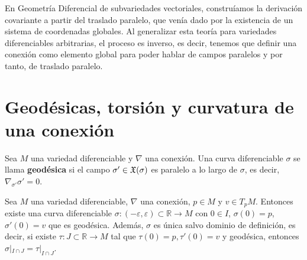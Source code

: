 \begin{obs}
    En Geometría Diferencial de subvariedades vectoriales, construíamos la derivación covariante a partir del traslado paralelo, que venía dado por la existencia de un sistema de coordenadas globales. Al generalizar esta teoría para variedades diferenciables arbitrarias, el proceso es inverso, es decir, tenemos que definir una conexión como elemento global para poder hablar de campos paralelos y por tanto, de traslado paralelo.
\end{obs}

\section{Geodésicas, torsión y curvatura de una conexión}

\begin{defi}
    Sea $M$ una variedad diferenciable y $\nabla$ una conexión. Una curva diferenciable $\sigma$ se llama \textbf{geodésica} si el campo $\sigma' \in \mathfrak{X}(\sigma)$ es paralelo a lo largo de $\sigma$, es decir, $\nabla_{\sigma'}\sigma' = 0$.
\end{defi}
\begin{teo}
    Sea $M$ una variedad diferenciable, $\nabla$ una conexión, $p \in M$ y $v \in T_pM$. Entonces existe una curva diferenciable $\sigma: (-\varepsilon, \varepsilon) \subset \mathbb R \to M$ con $0 \in I$, $\sigma(0) = p$, $\sigma'(0) = v$ que es geodésica. Además, $\sigma$ es única salvo dominio de definición, es decir, si existe $\tau: J \subset \mathbb R \to M$ tal que $\tau(0) = p, \tau'(0) = v$ y geodésica, entonces $\sigma|_{I \cap J} = \tau|_{I \cap J}$.
\end{teo}
